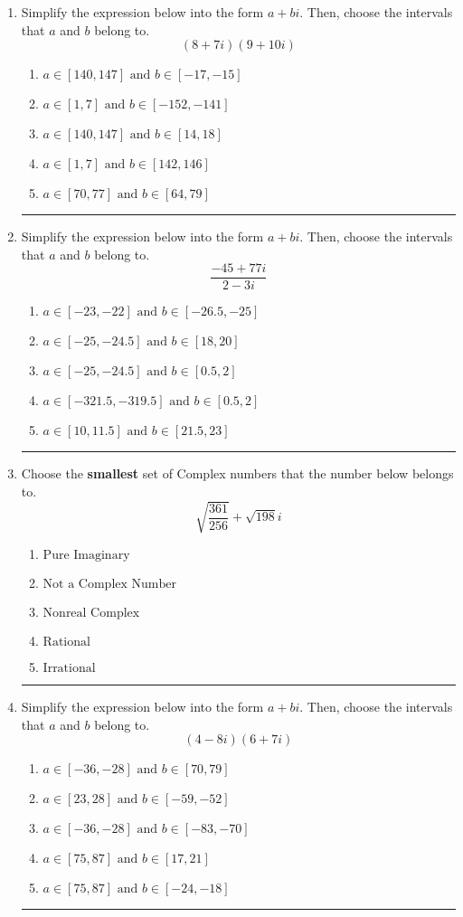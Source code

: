 \documentclass[14pt]{extbook}
\newcommand{\litem}[1]{\item#1\hspace*{-1cm}\rule{\textwidth}{0.4pt}}
\begin{document}
\begin{enumerate}
{\begin{enumerate}[label=\Alph*.]
\end{enumerate} }
\litem{
Simplify the expression below into the form $a+bi$. Then, choose the intervals that $a$ and $b$ belong to.\[ (8 + 7 i)(9 + 10 i) \]\begin{enumerate}[label=\Alph*.]
\item \( a \in [140, 147] \text{ and } b \in [-17, -15] \)
\item \( a \in [1, 7] \text{ and } b \in [-152, -141] \)
\item \( a \in [140, 147] \text{ and } b \in [14, 18] \)
\item \( a \in [1, 7] \text{ and } b \in [142, 146] \)
\item \( a \in [70, 77] \text{ and } b \in [64, 79] \)

\end{enumerate} }
\litem{
Simplify the expression below into the form $a+bi$. Then, choose the intervals that $a$ and $b$ belong to.\[ \frac{-45 + 77 i}{2 - 3 i} \]\begin{enumerate}[label=\Alph*.]
\item \( a \in [-23, -22] \text{ and } b \in [-26.5, -25] \)
\item \( a \in [-25, -24.5] \text{ and } b \in [18, 20] \)
\item \( a \in [-25, -24.5] \text{ and } b \in [0.5, 2] \)
\item \( a \in [-321.5, -319.5] \text{ and } b \in [0.5, 2] \)
\item \( a \in [10, 11.5] \text{ and } b \in [21.5, 23] \)

\end{enumerate} }
\litem{
Choose the \textbf{smallest} set of Complex numbers that the number below belongs to.\[ \sqrt{\frac{361}{256}}+\sqrt{198} i \]\begin{enumerate}[label=\Alph*.]
\item \( \text{Pure Imaginary} \)
\item \( \text{Not a Complex Number} \)
\item \( \text{Nonreal Complex} \)
\item \( \text{Rational} \)
\item \( \text{Irrational} \)

\end{enumerate} }
\litem{
Simplify the expression below into the form $a+bi$. Then, choose the intervals that $a$ and $b$ belong to.\[ (4 - 8 i)(6 + 7 i) \]\begin{enumerate}[label=\Alph*.]
\item \( a \in [-36, -28] \text{ and } b \in [70, 79] \)
\item \( a \in [23, 28] \text{ and } b \in [-59, -52] \)
\item \( a \in [-36, -28] \text{ and } b \in [-83, -70] \)
\item \( a \in [75, 87] \text{ and } b \in [17, 21] \)
\item \( a \in [75, 87] \text{ and } b \in [-24, -18] \)


\end{enumerate}}
\end{enumerate}
\end{document}
